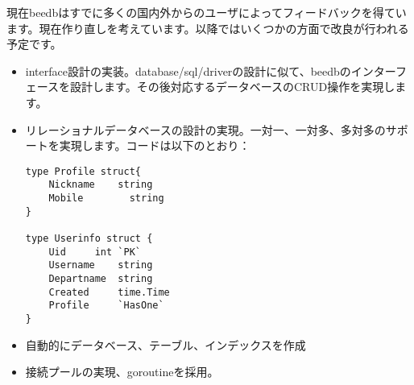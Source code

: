 現在beedbはすでに多くの国内外からのユーザによってフィードバックを得ています。現在作り直しを考えています。以降ではいくつかの方面で改良が行われる予定です。

\begin{itemize}
  \item interface設計の実装。database/sql/driverの設計に似て、beedbのインターフェースを設計します。その後対応するデータベースのCRUD操作を実現します。
  \item リレーショナルデータベースの設計の実現。一対一、一対多、多対多のサポートを実現します。コードは以下のとおり：
\begin{lstlisting}[numbers=none]
type Profile struct{
    Nickname    string
    Mobile        string
}

type Userinfo struct {
    Uid     int `PK`
    Username    string
    Departname  string
    Created     time.Time
    Profile     `HasOne`
}
\end{lstlisting}
  \item 自動的にデータベース、テーブル、インデックスを作成
  \item 接続プールの実現、goroutineを採用。
\end{itemize}
